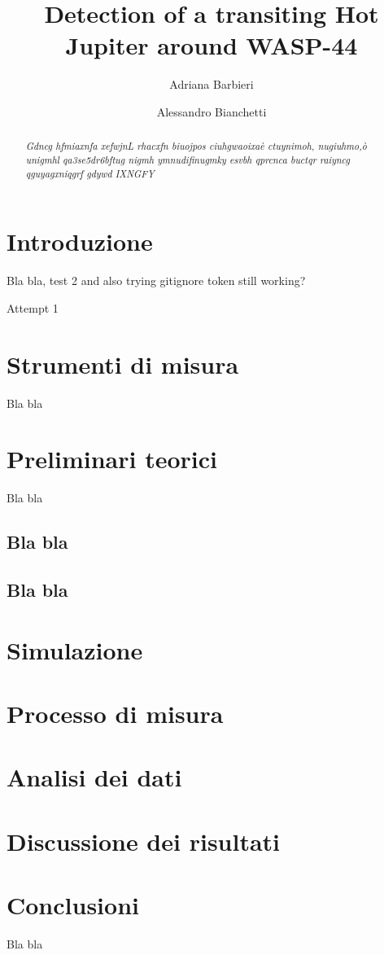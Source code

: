 \documentclass[a4paper,11pt,twocolumn]{article}
\title{Detection of a transiting Hot Jupiter around WASP-44}
\author{Adriana Barbieri \and Alessandro Bianchetti}
\begin{document}
\maketitle

\begin{abstract}

\emph{Gdncg hfmiaxnfa   xefwjnL rhacxfn  biuojpos  ciuhgwaoixaè ctuynimoh, nugiuhmo,ò  unigmhl qa3se5dr6bftug nigmh ymnudifinugmky esvbh qprcnca buctqr  raiyncg  qguyagxniqgrf gdywd IXNGFY}

\end{abstract}

\section{Introduzione}

Bla bla, test 2
and also trying gitignore
token still working?

Attempt 1


\section{Strumenti di misura}

Bla bla



\section{Preliminari teorici}

Bla bla




\subsection{Bla bla}



\subsection{Bla bla}



\section{Simulazione}



\section{Processo di misura}






\section{Analisi dei dati}





\section{Discussione dei risultati}



\section{Conclusioni}

Bla bla
\end{document}
